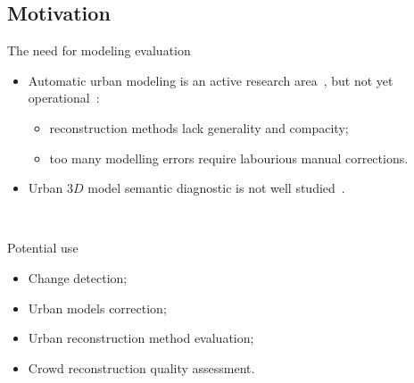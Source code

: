 \documentclass{beamer}
\begin{document}
        \subsection{Motivation}
            \begin{frame}{The need for modeling evaluation}
                \begin{itemize}[label=$\blacktriangleright$, font=\color{IGNGreen}]
                    \item<1-> Automatic urban modeling is an active research area~\citep{Musialski2012}, but not \textcolor{IGNRed}{yet operational}~\citep{rottensteiner2014results}:
                    \begin{itemize}[label=--]
                        \item reconstruction methods lack generality and compacity;
                        \item too many modelling errors require labourious manual corrections.
                    \end{itemize}
                    \item<2-> Urban $3D$ model semantic diagnostic is not well studied~\citep{nguatem2017modeling}.
                \end{itemize}
                ~\\
            \end{frame}

            \begin{frame}{Potential use}
                \begin{itemize}[label=$\blacktriangleright$, font=\color{IGNGreen}, itemsep=2em]
                    \item<1-> Change detection;
                    \item<2-> Urban models correction;
                    \item<3-> Urban reconstruction method evaluation;
                    \item<4-> Crowd reconstruction quality assessment.
                \end{itemize}
            \end{frame}
\end{document}
